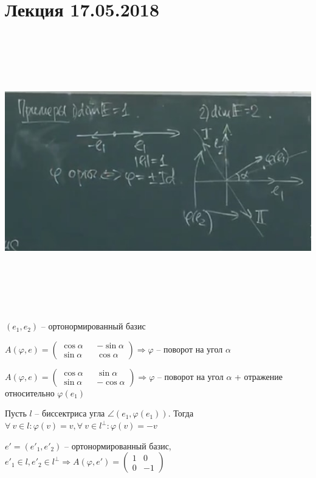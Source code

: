 \section{Лекция 17.05.2018}

\includegraphics[width=15cm,height=12cm,keepaspectratio]{examples1.jpg}

\bigskip
$(e_1, e_2)$ -- ортонормированный базис

\bigskip
{} $A(\varphi, e) = \begin{pmatrix} \cos \alpha && -\sin \alpha \\ \sin \alpha && \cos \alpha
\end{pmatrix} \Rightarrow \varphi$ -- поворот на угол $\alpha$

\bigskip
{} $A(\varphi, e) = \begin{pmatrix} \cos \alpha && \sin \alpha \\ \sin \alpha && -\cos \alpha \end{pmatrix} \Rightarrow \varphi$ -- поворот на угол $\alpha$ + отражение относительно $\varphi(e_1)$

Пусть $l$ -- биссектриса угла $\angle (e_1, \varphi(e_1))$. Тогда $\forall \ v \in l: \varphi(v) = v, \forall \ v \in l^{\bot}: \varphi(v) = -v$

$e' = (e'_1, e'_2)$ -- ортонормированный базис, $e'_1 \in l, e'_2 \in l^{\bot} \Rightarrow A(\varphi, e') = \begin{pmatrix} 1 & 0 \\ 0 & -1 \end{pmatrix}$

